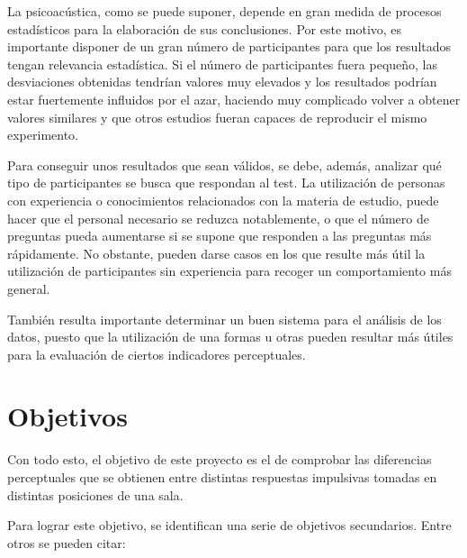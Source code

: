\documentclass[11pt,a4paper]{book}
\begin{document}
    La psicoacústica, como se puede suponer, depende en gran medida de procesos estadísticos para la elaboración de sus conclusiones. Por este motivo, es importante disponer de un gran número de participantes para que los resultados tengan relevancia estadística. Si el número de participantes fuera pequeño, las desviaciones obtenidas tendrían valores muy elevados y los resultados podrían estar fuertemente influidos por el azar, haciendo muy complicado volver a obtener valores similares y que otros estudios fueran capaces de reproducir el mismo experimento.
    
    Para conseguir unos resultados que sean válidos, se debe, además, analizar qué tipo de participantes se busca que respondan al test. La utilización de personas con experiencia o conocimientos relacionados con la materia de estudio, puede hacer que el personal necesario se reduzca notablemente, o que el número de preguntas pueda aumentarse si se supone que responden a las preguntas más rápidamente. No obstante, pueden darse casos en los que resulte más útil la utilización de participantes sin experiencia para recoger un comportamiento más general.
    
    También resulta importante determinar un buen sistema para el análisis de los datos, puesto que la utilización de una formas u otras pueden resultar más útiles para la evaluación de ciertos indicadores perceptuales.
    
    \section{Objetivos}
        Con todo esto, el objetivo de este proyecto es el de comprobar las diferencias perceptuales que se obtienen entre distintas respuestas impulsivas tomadas en distintas posiciones de una sala.
        
        Para lograr este objetivo, se identifican una serie de objetivos secundarios. Entre otros se pueden citar:
        
\end{document}
